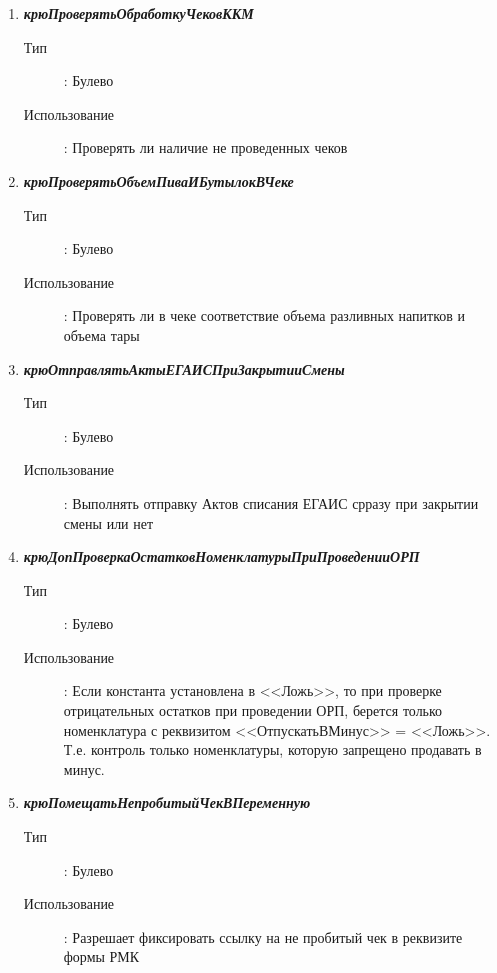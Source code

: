 \begin{enumerate}[label=(\arabic*)]
\vspace{\baselineskip}
\item \textbf{\textit{крюПроверятьОбработкуЧековККМ}}
\begin{description}
    \item[Тип] : Булево
    \item[Использование]: Проверять ли наличие не проведенных чеков
\end{description}

\vspace{\baselineskip}
\item \textbf{\textit{крюПроверятьОбъемПиваИБутылокВЧеке}}
\begin{description}
    \item[Тип] : Булево
    \item[Использование]: Проверять ли в чеке соответствие объема разливных напитков и объема тары
\end{description}

\vspace{\baselineskip}
\item \textbf{\textit{крюОтправлятьАктыЕГАИСПриЗакрытииСмены}}
\begin{description}
    \item[Тип] : Булево
    \item[Использование]: Выполнять отправку Актов списания ЕГАИС срразу при закрытии смены или нет
\end{description}

\vspace{\baselineskip}
\item \textbf{\textit{крюДопПроверкаОстатковНоменклатурыПриПроведенииОРП}}
\begin{description}
    \item[Тип] : Булево
    \item[Использование]: Если константа установлена в <<Ложь>>, то при проверке отрицательных остатков при проведении ОРП, берется только номенклатура с реквизитом <<ОтпускатьВМинус>> = <<Ложь>>. Т.е. контроль только номенклатуры, которую запрещено продавать в минус.
\end{description}

\vspace{\baselineskip}
\item \textbf{\textit{крюПомещатьНепробитыйЧекВПеременную}}
\begin{description}
    \item[Тип] : Булево
    \item[Использование]: Разрешает фиксировать ссылку на не пробитый чек в реквизите формы РМК
\end{description}



\end{enumerate}
